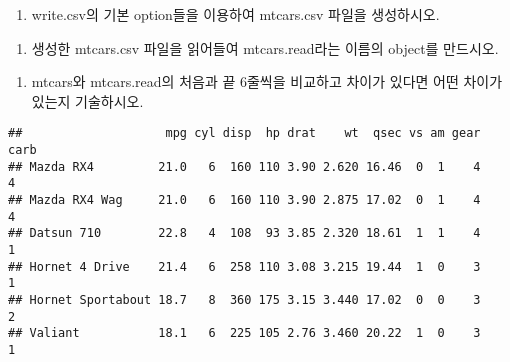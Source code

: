 \documentclass[]{article}
\newenvironment{Shaded}{\begin{snugshade}}{\end{snugshade}}
\newcommand{\KeywordTok}[1]{\textcolor[rgb]{0.13,0.29,0.53}{\textbf{#1}}}
\newcommand{\StringTok}[1]{\textcolor[rgb]{0.31,0.60,0.02}{#1}}
\newcommand{\CommentTok}[1]{\textcolor[rgb]{0.56,0.35,0.01}{\textit{#1}}}
\newcommand{\NormalTok}[1]{#1}
\providecommand{\tightlist}{%
  \setlength{\itemsep}{0pt}\setlength{\parskip}{0pt}}
\begin{document}
\begin{enumerate}
\def\labelenumi{\arabic{enumi})}
\setcounter{enumi}{2}
\tightlist
\item
  write.csv의 기본 option들을 이용하여 mtcars.csv 파일을 생성하시오.
\end{enumerate}

\begin{Shaded}
\end{Shaded}

\begin{enumerate}
\def\labelenumi{\arabic{enumi})}
\setcounter{enumi}{3}
\tightlist
\item
  생성한 mtcars.csv 파일을 읽어들여 mtcars.read라는 이름의 object를
  만드시오.
\end{enumerate}

\begin{Shaded}
\end{Shaded}

\begin{enumerate}
\def\labelenumi{\arabic{enumi})}
\setcounter{enumi}{4}
\tightlist
\item
  mtcars와 mtcars.read의 처음과 끝 6줄씩을 비교하고 차이가 있다면 어떤
  차이가 있는지 기술하시오.
\end{enumerate}

\begin{Shaded}
\end{Shaded}

\begin{verbatim}
##                    mpg cyl disp  hp drat    wt  qsec vs am gear carb
## Mazda RX4         21.0   6  160 110 3.90 2.620 16.46  0  1    4    4
## Mazda RX4 Wag     21.0   6  160 110 3.90 2.875 17.02  0  1    4    4
## Datsun 710        22.8   4  108  93 3.85 2.320 18.61  1  1    4    1
## Hornet 4 Drive    21.4   6  258 110 3.08 3.215 19.44  1  0    3    1
## Hornet Sportabout 18.7   8  360 175 3.15 3.440 17.02  0  0    3    2
## Valiant           18.1   6  225 105 2.76 3.460 20.22  1  0    3    1
\end{verbatim}
\end{document}
